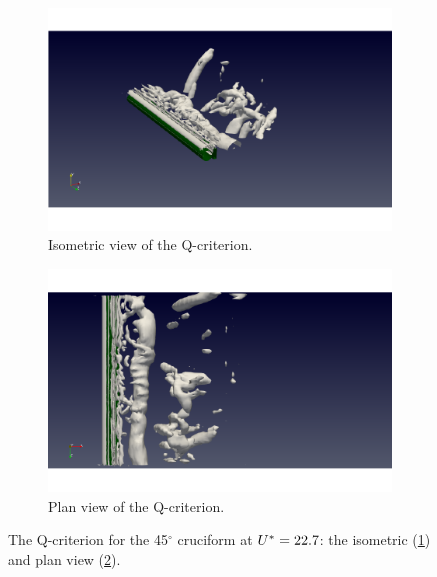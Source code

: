 \documentclass[oneside]{utmthesis}
\begin{document}
\begin{figure}
  \centering
  \begin{subfigure}[h]{0.9\textwidth}
    \includegraphics[width=\textwidth]{figs/qIso000U10}
    \caption{Isometric view of the Q-criterion.}
    \label{fig:qIso000U10}
  \end{subfigure}

  \begin{subfigure}[h]{0.9\textwidth}
    \includegraphics[width=\textwidth]{figs/qTop000U10}
    \caption{Plan view of the Q-criterion.}
    \label{fig:qTop000U10}
  \end{subfigure}

  \caption{The Q-criterion for the 45$^{\circ}$ cruciform at $U^{*} = 22.7$: the isometric (\ref{fig:qIso000U10}) and plan view (\ref{fig:qTop000U10}).} \label{fig:qCrit000U10}
\end{figure}
\end{document}
